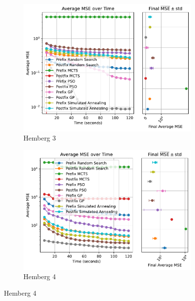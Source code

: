 \documentclass[runningheads]{llncs}
\begin{document}
\begin{figure}
    \begin{subfigure}[b]{0.49\textwidth}
        \includegraphics[width=\linewidth, keepaspectratio]{Hemberg_Benchmarks/Hemberg_Benchmark_3.pdf}
        \caption{Hemberg 3}
        \label{subfig:hemberg_3}
    \end{subfigure}
    \begin{subfigure}[b]{0.49\textwidth}
        \includegraphics[width=\linewidth, keepaspectratio]{Hemberg_Benchmarks/Hemberg_Benchmark_4.pdf}
        \caption{Hemberg 4}
        \label{subfig:hemberg_4}
    \end{subfigure}
    

\end{figure}
\end{document}
